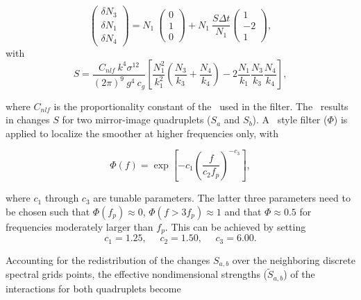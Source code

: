 \begin{equation}
\left ( \begin{array}{l} \delta N_3 \\ \delta N_1 \\ \delta N_4 
\end{array} \right ) = 
N_1 \: \left ( \begin{array}{c} 0 \\ 1 \\ 0 \end{array} \right ) +
N_1 \:  \frac{S \Delta t}{N_1}
\left ( \begin{array}{r} 1 \\ -2 \\ 1 \end{array} \right )
 , \label{eq:nls_dist}
\end{equation}
with
\begin{equation}
S = \frac{C_{nlf} \: k^4 \sigma^{12} }{(2\pi)^9 \: g^4 \: c_g }
\left [ \frac{N_1^2}{k_1^2}  \left ( \frac{N_3}{k_3}+\frac{N_4}{k_4} \right ) 
               - 2 \frac{N_1}{k_1} \frac{N_3}{k_3} \frac{N_4}{k_4} \right ]
, \label{eq:nls_S}
\end{equation}

\noindent 
where $C_{nlf}$ is the proportionality constant of the \dia\ used in the
filter.  The \dia\ results in changes $S$ for two mirror-image quadruplets
($S_a$ and $S_b$). A \js\ style filter ($\Phi$) is applied to localize the
smoother at higher frequencies only, with


\begin{equation}
\Phi(f) = \exp \left [ -c_1 \left ( \frac{f}{c_2 f_p} \right ) ^ {-c_3}
               \right ] ,
\label{eq:nls_filter}
\end{equation}

\noindent
where $c_1$ through $c_3$ are tunable parameters.  The latter three parameters
need to be chosen such that $\Phi(f_p) \approx 0$, $\Phi(f > 3f_p) \approx 1$
and that $\Phi \approx 0.5$ for frequencies moderately larger than $f_p$. This
can be achieved by setting
\begin{equation}
c_1 = 1.25, \:\:\:  \:\:\: c_2 = 1.50, \:\:\:  \:\:\: c_3 = 6.00. 
\label{eq:nls_f_parms}
\end{equation}

 
Accounting for the redistribution of the changes $S_{a,b}$ over the
neighboring discrete spectral grids points, the effective nondimensional
strengths ($\tilde{S}_{a,b}$) of the interactions for both quadruplets become

